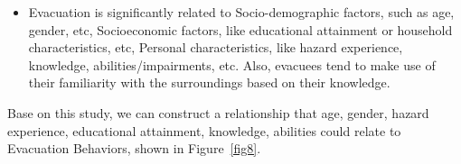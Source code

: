 \begin{itemize}
\item Evacuation is significantly related to Socio-demographic factors, such as age, gender, etc, Socioeconomic factors, like educational attainment or household characteristics, etc, Personal characteristics, like hazard experience, knowledge, abilities/impairments, etc. Also, evacuees tend to make use of their familiarity with the surroundings based on their knowledge.~\cite{Wang2021IncorporatingHF}
\end{itemize}

Base on this study, we can construct a relationship that age, gender, hazard experience,  educational attainment, knowledge, abilities could relate to Evacuation Behaviors, shown in Figure~\ref{fig8}. 

